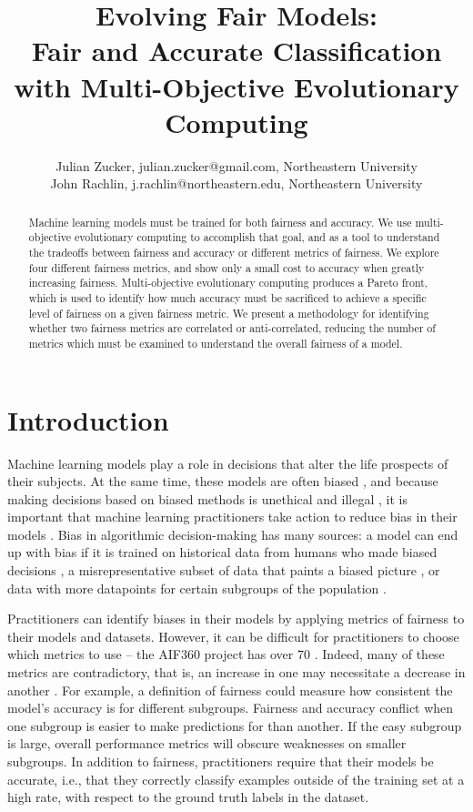 \documentclass{elsarticle}
\title{Evolving Fair Models: \\
Fair and Accurate Classification with Multi-Objective Evolutionary Computing}
\author{
	Julian Zucker, julian.zucker@gmail.com, Northeastern University \\
	John Rachlin, j.rachlin@northeastern.edu, Northeastern University 
}
\begin{document}
\begin{abstract}
Machine learning models must be trained for both fairness and accuracy. We use multi-objective evolutionary computing to accomplish that goal, and as a tool to understand the tradeoffs between fairness and accuracy or different metrics of fairness. We explore four different fairness metrics, and show only a small cost to accuracy when greatly increasing fairness. Multi-objective evolutionary computing produces a Pareto front, which is used to identify how much accuracy must be sacrificed to achieve a specific level of fairness on a given fairness metric. We present a methodology for identifying whether two fairness metrics are correlated or anti-correlated, reducing the number of metrics which must be examined to understand the overall fairness of a model. 
\end{abstract}
\maketitle


\section{Introduction}
Machine learning models play a role in decisions that alter the life prospects of their subjects. At the same time, these models are often biased \citep{Angwin:2016}, and because making decisions based on biased methods is unethical and illegal \citep{Barocas:2016}, it is important that machine learning practitioners take action to reduce bias in their models \citep{Binns:2017}. Bias in algorithmic decision-making has many sources: a model can end up with bias if it is trained on historical data from humans who made biased decisions \citep{Calders:2013}, a misrepresentative subset of data that paints a biased picture \citep{Suresh:2019}, or data with more datapoints for certain subgroups of the population \citep{Torralba:2011}. 

Practitioners can identify biases in their models by applying metrics of fairness to their models and datasets. However, it can be difficult for practitioners to choose which metrics to use – the AIF360 project has over 70 \citep{Bellamy:2018}. Indeed, many of these metrics are contradictory, that is, an increase in one may necessitate a decrease in another \citep{Kleinberg:2016}. For example, a definition of fairness could measure how consistent the model’s accuracy is for different subgroups. Fairness and accuracy conflict when one subgroup is easier to make predictions for than another. If the easy subgroup is large, overall performance metrics will obscure weaknesses on smaller subgroups. In addition to fairness, practitioners require that their models be accurate, i.e., that they correctly classify examples outside of the training set at a high rate, with respect to the ground truth labels in the dataset.
\end{document}
